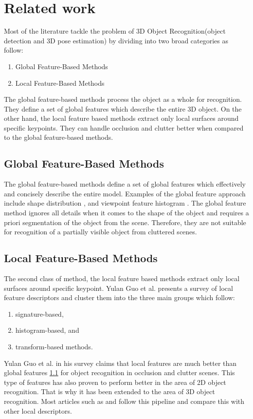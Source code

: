 
\chapter{Related work}
\label{chap:relwork}

Most of the literature tackle the problem of 3D Object Recognition(object detection and 3D pose estimation) by dividing into two broad categories as follow:
\begin{enumerate}
\item Global Feature-Based Methods
\item Local Feature-Based Methods
\end{enumerate}

The global feature-based methods process the object as a whole for recognition. They define a set of global features which describe the entire 3D object.
On the other hand, the local feature based methods extract only local surfaces around specific keypoints. They can handle occlusion and clutter better when compared to the global feature-based methods.


\section{Global Feature-Based Methods} \label{global}

The global feature-based methods define a set of global features which effectively and concisely describe the entire model. Examples of the global feature approach include shape distribution \cite{shapedist}, and viewpoint feature histogram \cite{vfh}.
The global feature method ignores all details when it comes to the shape of the object and requires a priori segmentation of the object from the scene. 
Therefore, they are not suitable for recognition of a partially visible object from cluttered scenes. 

\section{Local Feature-Based Methods}

The second class of method, the local feature based methods extract only local surfaces around specific keypoint. Yulan Guo et al. \cite{survey} presents a survey of local feature descriptors and cluster them into the three main groups which follow:
\begin{enumerate}
\item signature-based,
\item histogram-based, and
\item transform-based methods.
\end{enumerate}

Yulan Guo et al. \cite{survey} in his survey claims that local features are much better than global features \ref{global} for object recognition in occlusion and clutter scenes. 
This type of features has also proven to perform better in the area of 2D object recognition. That is why it has been extended to the area of 3D object recognition. Most articles such as \cite{algFpfh} and \cite{repMatching} follow this pipeline and compare this with other local descriptors.

